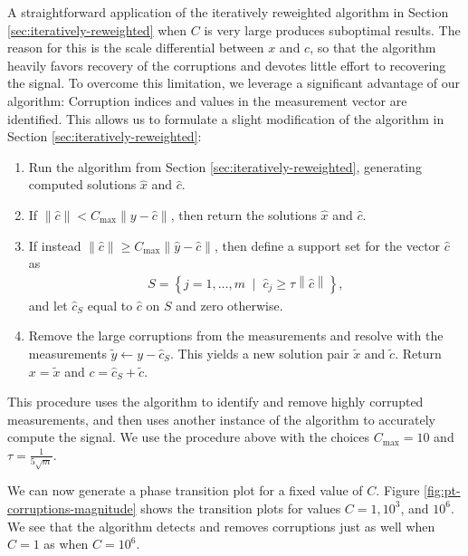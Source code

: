 {A straightforward application of the iteratively reweighted algorithm in Section \ref{sec:iteratively-reweighted} when $C$ is very large produces suboptimal results. The reason for this is the scale differential between $x$ and $c$, so that the algorithm heavily favors recovery of the corruptions and devotes little effort to recovering the signal. To overcome this limitation, we leverage a significant advantage of our algorithm: Corruption indices and values in the measurement vector are identified. This allows us to formulate a slight modification of the algorithm in Section \ref{sec:iteratively-reweighted}:
\begin{enumerate}
  \item Run the algorithm from Section \ref{sec:iteratively-reweighted}, generating computed solutions $\widehat{x}$ and $\widehat{c}$.
  \item If $\| \widehat{c} \| < C_{\mathrm{max}} \| y - \widehat{c} \|$, then return the solutions $\widehat{x}$ and $\widehat{c}$.
  \item If instead $\| \widehat{c} \| \geq C_{\mathrm{max}} \| \widehat{y} - \widehat{c} \|$, then define a support set for the vector $\widehat{c}$ as
    \begin{align*}
      S = \left\{ j=1, \ldots, m\;\; | \;\; \widehat{c}_j \geq \tau \left\| \widehat{c}\right\| \right\},
    \end{align*}
    and let $\widehat{c}_S$ equal to $\widehat{c}$ on $S$ and zero otherwise.
  \item Remove the large corruptions from the measurements and resolve with the measurements $\widetilde{y} \gets y - \widehat{c}_S$. This yields a new solution pair $\widetilde{x}$ and $\widetilde{c}$. Return $x = \widetilde{x}$ and $c = \widehat{c}_S + \widetilde{c}$.
\end{enumerate}
This procedure uses the algorithm to identify and remove highly corrupted measurements, and then uses another instance of the algorithm to accurately compute the signal. We use the procedure above with the choices $C_{\mathrm{max}} = 10$ and $\tau = \frac{1}{5 \sqrt{m}}$. 

We can now generate a phase transition plot for a fixed value of $C$. Figure \ref{fig:pt-corruptions-magnitude} shows the transition plots for values $C = 1, 10^3$, and $10^6$. We see that the algorithm detects and removes corruptions just as well when $C = 1$ as when $C = 10^6$.

}
